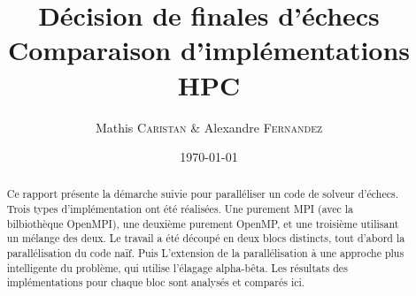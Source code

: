 \documentclass[12pt]{article}
\title{Décision de finales d'échecs\\ Comparaison d'implémentations \\ HPC} %
\author{Mathis \textsc{Caristan} \& Alexandre \textsc{Fernandez}} %
\date{\today} %
\begin{document}
\maketitle %

\begin{abstract}
    Ce rapport présente la démarche suivie pour paralléliser un code de solveur d'échecs.
    Trois types d'implémentation ont été réalisées.
    Une purement MPI (avec la bilbiothèque OpenMPI), une deuxième purement OpenMP,
    et une troisième utilisant un mélange des deux.
    Le travail a été découpé en deux blocs distincts, tout d'abord la parallélisation
    du code \og naïf\fg. Puis L'extension de la parallélisation à une approche plus
    intelligente du problème, qui utilise \og l'élagage alpha-bêta\fg.
    Les résultats des implémentations pour chaque bloc sont analysés et comparés ici.
\end{abstract}

\end{document}
